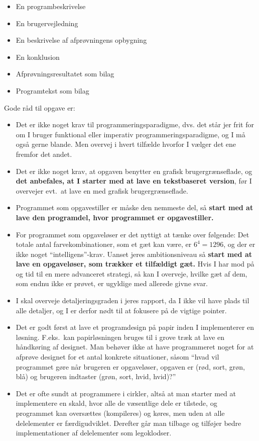 \documentclass[a4paper,12pt]{article}
\begin{document}
\begin{enumerate}[label=8g.\arabic*,start=0]
\begin{itemize}
\begin{itemize}
    \item En programbeskrivelse
    \item En brugervejledning
    \item En beskrivelse af afprøvningens opbygning
    \item En konklusion
    \item Afprøvningsresultatet som bilag
    \item Programtekst som bilag
    \end{itemize}
  \end{itemize}
  Gode råd til opgave er:
  \begin{itemize}
  \item Det er ikke noget krav til programmeringsparadigme, dvs. det står jer frit for om I bruger funktional eller imperativ programmeringsparadigme, og I må også gerne blande. Men overvej i hvert tilfælde hvorfor I vælger det ene fremfor det andet.
  \item Det er ikke noget krav, at opgaven benytter en grafisk brugergrænseflade, og \textbf{det anbefales, at I starter med at lave en tekstbaseret version}, før I overvejer evt.\ at lave en med grafisk brugergrænseflade.
  \item Programmet som opgavestiller er måske den nemmeste del, så \textbf{start med at lave den programdel, hvor programmet er opgavestiller.}
  \item For programmet som opgaveløser er det nyttigt at tænke over følgende: Det totale antal farvekombinationer, som et gæt kan være, er $6^4=1296$, og der er ikke noget ``intelligens''-krav. Uanset jeres ambitionsniveau så \textbf{start med at lave en opgaveløser, som trækker et tilfældigt gæt.} Hvis I har mod på og tid til en mere advanceret strategi, så kan I overveje, hvilke gæt af dem, som endnu ikke er prøvet, er ugyldige med allerede givne svar.
  \item I skal overveje detaljeringsgraden i jeres rapport, da I ikke vil have plads til alle detaljer, og I er derfor nødt til at fokusere på de vigtige pointer.
  \item Det er godt først at lave et programdesign på papir inden I implementerer en løsning. F.eks.\ kan papirløsningen bruges til i grove træk at lave en håndkøring af designet. Man behøver ikke at have programmeret noget for at afprøve designet for et antal konkrete situationer, såsom ``hvad vil programmet gøre når brugeren er opgaveløser, opgaven er (rød, sort, grøn, blå) og brugeren indtaster (grøn, sort, hvid, hvid)?''
  \item Det er ofte sundt at programmere i cirkler, altså at man starter med at implementere en skald, hvor alle de væsentlige dele er tilstede, og programmet kan oversættes (kompileres) og køres, men uden at alle delelementer er færdigudviklet. Derefter går man tilbage og tilføjer bedre implementationer af delelementer som legoklodser.

\end{itemize}
\end{enumerate}
\end{document}
